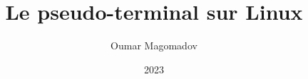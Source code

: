 \documentclass{beamer}
\title{Le pseudo-terminal sur Linux}
\author{Oumar Magomadov}
\institute{École Supérieure d'Informatique}
\date{2023}
\begin{document}
\frame{\titlepage}

\begin{frame}
\end{frame}
\end{document}
